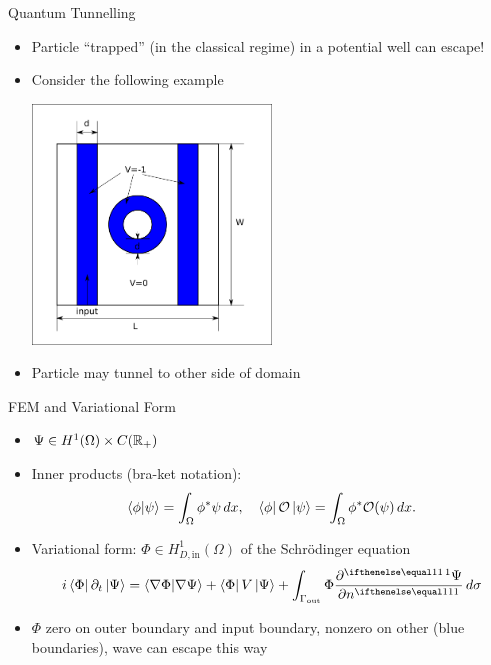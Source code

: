 \documentclass{beamer}
\begin{document}
\begin{frame}{Quantum Tunnelling}
  \begin{itemize}
	\item Particle ``trapped'' (in the classical regime) in a potential
			well can escape!
	\item Consider the following example 

  \begin{center}
  \includegraphics[width=0.5\textwidth]
  {../writeup/sections/intro/system-sketch.png}
  \end{center}

	\item Particle may tunnel to other side of domain
  \end{itemize}
\end{frame}

\begin{frame}{FEM and Variational Form}
  \begin{itemize}
	\item $\Psi \in H^1(\Omega) \times C(\mathbb{R}_+)$
	\item Inner products (bra-ket notation):
			\[
					\bra{\phi}\ket{\psi} = \int_\Omega 
					\phi^* \psi \, dx, \quad 
					\bra{\phi} \mathcal O \ket{\psi} = 
					\int_\Omega \phi^* \mathcal O(\psi) \, dx
			.\] 
	\item Variational form: $\Phi \in H^1_{D, \mathrm{in}}(\Omega)$
			of the Schr\"odinger equation
			\[
			i \bra{\Phi} \partial_t \ket{\Psi} = 
			\bra{\nabla \Phi} \ket{\nabla \Psi} + 
			\bra{\Phi} V \ket{\Psi} + 
			\int_{\Gamma_\mathrm{out}} \Phi \pder{\Psi}{n} \, d\sigma
			\] 
	\item $\Phi$ zero on outer boundary and input boundary, 
			nonzero on other (blue boundaries), wave can escape this way

\end{itemize}
\end{frame}
\end{document}
